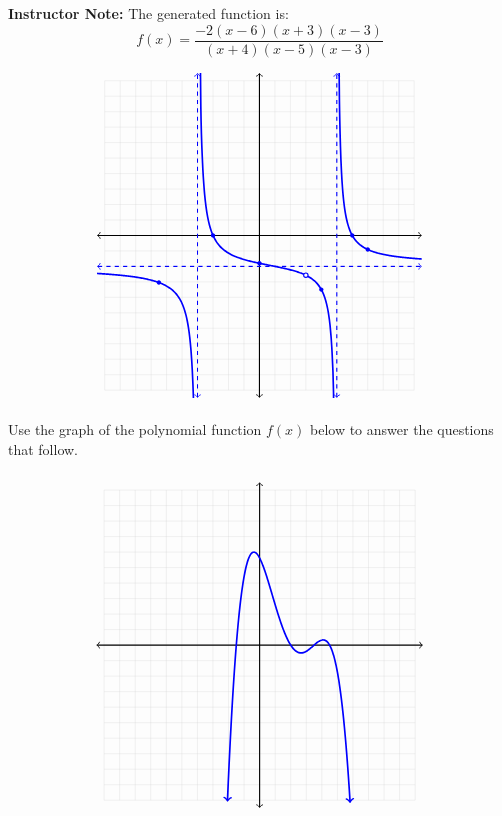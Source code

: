 \documentclass[addpoints]{exam}
\begin{document}
\begin{questions}
\vspace{12pt}

\begin{solution}
\textbf{Instructor Note:} The generated function is: \[f(x) = \frac{-2(x - 6)(x + 3)(x - 3)}{(x + 4)(x - 5)(x - 3)}\] 

 \[\begin{tikzpicture}[scale=0.39] \draw[step=1cm, gray!40, very thin] (-10,-10) grid (10,10); \draw[thick, <->] (-10.5,0) -- (10.5,0); \draw[thick, <->] (0,-10.5) -- (0,10.5); \clip (-10.5,-10.5) rectangle (10.5,10.5);\draw[dashed, blue, thick, <->] (-4, -10.5) -- (-4, 10.5); \draw[dashed, blue, thick, <->] (5, -10.5) -- (5, 10.5); \draw[dashed, blue, thick, <->] (-10.5, -2) -- (10.5, -2); \draw[blue, very thick, samples=80, domain=-10.5:-4.10000000000000, smooth] plot (\x, {-2 * (\x - (6)) * (\x - (-3)) / ((\x - (-4)) * (\x - (5)))}); \draw[blue, very thick, samples=80, domain=-3.90000000000000:4.90000000000000, smooth] plot (\x, {-2 * (\x - (6)) * (\x - (-3)) / ((\x - (-4)) * (\x - (5)))}); \draw[blue, very thick, samples=80, domain=5.10000000000000:10.5, smooth] plot (\x, {-2 * (\x - (6)) * (\x - (-3)) / ((\x - (-4)) * (\x - (5)))}); \fill[blue] (-3.0, 0) circle (4pt); \fill[blue] (6.0, 0) circle (4pt); \fill[blue] (0, -1.8) circle (4pt); \fill[blue] (-6.5, -3.04) circle (4pt); \fill[blue] (4.0, -3.5) circle (4pt); \fill[blue] (7.0, -0.91) circle (4pt); \draw[blue, thick, fill=white] (3.0, -2.57) circle (4pt); \end{tikzpicture}\]
\end{solution}
\newpage


\question   Use the graph of the polynomial function \(f(x)\) below to answer the questions that follow.

 \[\begin{tikzpicture}[scale=0.39] \draw[step=1cm, gray!40, very thin] (-10,-10) grid (10,10); \draw[thick, <->] (-10.5,0) -- (10.5,0); \draw[thick, <->] (0,-10.5) -- (0,10.5); \clip (-11,-11) rectangle (11,11); \draw[<->, blue, very thick, samples=150, domain=-2.07:5.82, smooth] plot (\x, {-0.118881 * (\x + 1.5) * (\x - 2) * (\x - 3.5) * (\x - 4.5)}); \end{tikzpicture}\]
\begin{parts}

\end{parts}
\end{questions}
\end{document}
